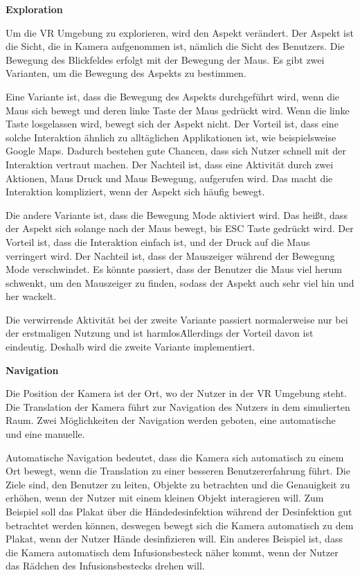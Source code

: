   \vspace{1em}
  \noindent
  \textbf{Exploration}
  \vspace{1em}
  
  \noindent
  Um die VR Umgebung zu explorieren, wird den Aspekt verändert. Der Aspekt ist die Sicht, die in Kamera aufgenommen ist, nämlich die Sicht des Benutzers. Die Bewegung des Blickfeldes erfolgt mit der Bewegung der Maus. Es gibt zwei Varianten, um die Bewegung des Aspekts zu bestimmen.
  
  Eine Variante ist, dass die Bewegung des Aspekts durchgeführt wird, wenn die Maus sich bewegt und deren linke Taste der Maus gedrückt wird. Wenn die linke Taste losgelassen wird, bewegt sich der Aspekt nicht. Der Vorteil ist, dass eine solche Interaktion ähnlich zu alltäglichen Applikationen ist, wie beispielsweise Google Maps. Dadurch bestehen gute Chancen, dass sich Nutzer schnell mit der Interaktion vertraut machen. Der Nachteil ist, dass eine Aktivität durch zwei Aktionen, Maus Druck und Maus Bewegung, aufgerufen wird. Das macht die Interaktion kompliziert, wenn der Aspekt sich häufig bewegt.
  
  Die andere Variante ist, dass die Bewegung Mode aktiviert wird. Das heißt, dass der Aspekt sich solange nach der Maus bewegt, bis ESC Taste gedrückt wird. Der Vorteil ist, dass die Interaktion einfach ist, und der Druck auf die Maus verringert wird. Der Nachteil ist, dass der Mauszeiger während der Bewegung Mode verschwindet. Es könnte passiert, dass der Benutzer die Maus viel herum schwenkt, um den Mauszeiger zu finden, sodass der Aspekt auch sehr viel hin und her wackelt.
  
  Die verwirrende Aktivität bei der zweite Variante passiert normalerweise nur bei der erstmaligen Nutzung und ist \glqq harmlos\grqq\. Allerdings der Vorteil davon ist eindeutig. Deshalb wird die zweite Variante implementiert.
  
  \vspace{1em}
  \noindent
  \textbf{Navigation}
  \vspace{1em}
  
  \noindent
  Die Position der Kamera ist der Ort, wo der Nutzer in der VR Umgebung steht. Die Translation der Kamera führt zur Navigation des Nutzers in dem simulierten Raum. Zwei Möglichkeiten der Navigation werden geboten, eine automatische und eine manuelle.
  
  Automatische Navigation bedeutet, dass die Kamera sich automatisch zu einem Ort bewegt, wenn die Translation zu einer besseren Benutzererfahrung führt. Die Ziele sind, den Benutzer zu leiten, Objekte zu betrachten und die Genauigkeit zu erhöhen, wenn der Nutzer mit einem kleinen Objekt interagieren will. Zum Beispiel soll das Plakat über die Händedesinfektion während der Desinfektion gut betrachtet werden können, deswegen bewegt sich die Kamera automatisch zu dem Plakat, wenn der Nutzer Hände desinfizieren will. Ein anderes Beispiel ist, dass die Kamera automatisch dem Infusionsbesteck näher kommt, wenn der Nutzer das Rädchen des Infusionsbestecks drehen will.

